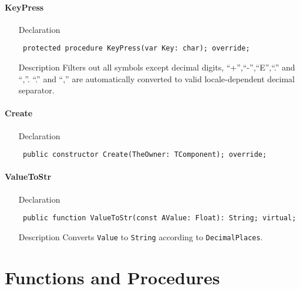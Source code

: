 \documentclass[12pt,a4paper,oneside]{report}
\newcommand{\declarationitem}[1]{{\addfontfeatures{FakeBold=1.3} #1}}
\newcommand{\descriptiontitle}[1]{{\addfontfeatures{FakeSlant}#1}}
\newcommand{\code}[1]{\texttt{#1}}
\begin{document}
\paragraph{KeyPress}\hspace*{\fill}
\label{lmnumericedits.TFloatEdit-KeyPress}
\begin{itemize}\item[\declarationitem{Declaration}\hfill]
\begin{flushleft}
\code{
protected procedure KeyPress(var Key: char); override;}
\end{flushleft}
\item[\descriptiontitle{Description}] Filters out all symbols except decimal digits, ``+'',``-'',``E'',``.'' and ``,''. ``.'' and ``,'' are automatically converted to valid locale-dependent decimal separator.
\end{itemize}
\paragraph{Create}\hspace*{\fill}
\label{lmnumericedits.TFloatEdit-Create}
\begin{itemize}\item[\declarationitem{Declaration}\hfill]
\begin{flushleft}
\code{
public constructor Create(TheOwner: TComponent); override;}
\end{flushleft}
\end{itemize}
\paragraph{ValueToStr}\hspace*{\fill}
\label{lmnumericedits.TFloatEdit-ValueToStr}
\begin{itemize}\item[\declarationitem{Declaration}\hfill]
\begin{flushleft}
\code{
public function ValueToStr(const AValue: Float): String; virtual;}
\end{flushleft}
\item[\descriptiontitle{Description}] Converts \code{Value} to \code{String} according to \code{DecimalPlaces}. 
\end{itemize}
\section{Functions and Procedures}
\end{document}
